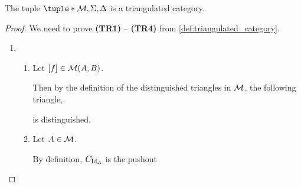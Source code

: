 \begin{theorem}
    \label{example:stable_module_category_triangulated}
    The tuple \( \tuple*{\Mc, \Sigma, \Delta} \) is a triangulated category.
\end{theorem}
\begin{proof}
    We need to prove {\bf (TR1)} -- {\bf (TR4)} from \autoref{def:triangulated_category}.
    \begin{enumerate}[label={(\bfseries TR\arabic*)}]
        \item {
            \begin{enumerate}
                \item {
                    Let \( [f] \in {\mathcal{M}}(A, B) \).
                    
                    Then by the definition of the distinguished triangles in \( {\mathcal{M}} \), the following triangle,
                    \begin{center}
                    \end{center}
                    is distinguished.
                }
                \item {
                    Let \( A \in {\mathcal{M}} \).
                    
                    By definition, \( C_{\operatorname{Id}_A} \) is the pushout
                    \begin{center}
\end{center}}
\end{enumerate}}
\end{enumerate}
\end{proof}
